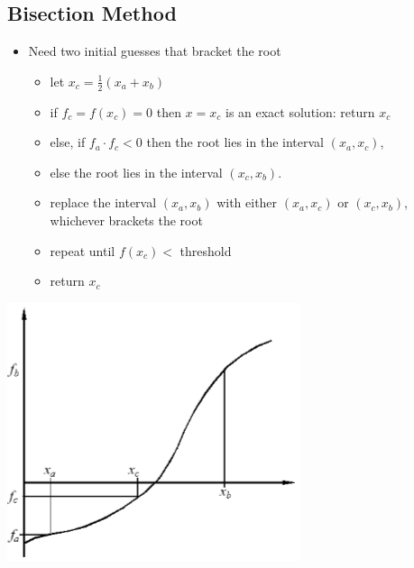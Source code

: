\documentclass{article}
\begin{document}
\subsection*{Bisection Method}
\begin{itemize}
    \item Need two initial guesses that bracket the root
    \begin{itemize}
        \item let $x_c = \frac{1}{2}(x_a + x_b)$
        \item if $f_c = f(x_c) = 0$ then $x = x_c$ is an exact solution: return $x_c$
        \item else, if $f_a \cdot f_c < 0$ then the root lies in the interval $(x_a, x_c)$,
        \item else the root lies in the interval $(x_c, x_b)$.
        \item replace the interval $(x_a, x_b)$ with either $(x_a, x_c)$ or $(x_c, x_b)$, whichever brackets the root
        \item repeat until $f(x_c) < $ threshold
        \item return $x_c$
    \end{itemize}
\end{itemize}
\begin{center}
    \includegraphics*[scale=0.8]{W4_3.png}
\end{center}
\end{document}
